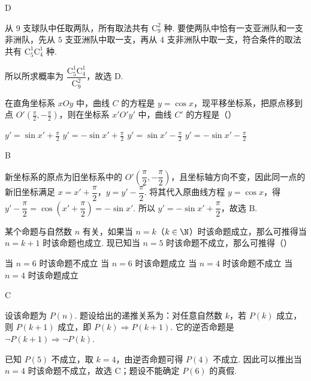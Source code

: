 \documentclass[UTF8,a4paper,oneside,11pt]{ctexbook}
\begin{document}
\begin{answer}
D
\end{answer}

\begin{solution}
从 \(9\) 支球队中任取两队，所有取法共有 \(\mathrm C_9^2\) 种. 要使两队中恰有一支亚洲队和一支非洲队，先从 \(5\) 支亚洲队中取一支，再从 \(4\) 支非洲队中取一支，符合条件的取法共有 \(\mathrm C_5^1\mathrm C_4^1\) 种.

所以所求概率为 \(\dfrac{\mathrm C_5^1\mathrm C_4^1}{\mathrm C_9^2}\)，故选 D.
\end{solution}

\begin{problem}
在直角坐标系 \(xOy\) 中，曲线 \(C\) 的方程是 \(y = \cos x\)，现平移坐标系，把原点移到点 \(O'\left(\frac{\pi}{2}, -\frac{\pi}{2}\right)\)，则在坐标系 \(x'O'y'\) 中，曲线 \(C'\) 的方程是（\quad）

\choices
    {\(y' = \sin x' + \frac{\pi}{2}\)}
    {\(y' = -\sin x' + \frac{\pi}{2}\)}
    {\(y' = \sin x' - \frac{\pi}{2}\)}
    {\(y' = -\sin x' - \frac{\pi}{2}\)}
\end{problem}

\begin{answer}
B
\end{answer}

\begin{solution}
新坐标系的原点为旧坐标系中的 \(O'\left(\dfrac\pi2,-\dfrac\pi2\right)\)，且坐标轴方向不变，因此同一点的新旧坐标满足
\(x=x'+\dfrac\pi2\)，\(y=y'-\dfrac\pi2\). 将其代入原曲线方程 \(y=\cos x\)，得
\(y'-\dfrac\pi2=\cos\left(x'+\dfrac\pi2\right)=-\sin x'\). 所以
\(y'=-\sin x'+\dfrac\pi2\)，故选 B.
\end{solution}

\begin{problem}
某个命题与自然数 \(n\) 有关，如果当 \(n = k\)（\(k \in \N\)）时该命题成立，那么可推得当 \(n = k + 1\) 时该命题也成立. 现已知当 \(n = 5\) 时该命题不成立，那么可推得（\quad）

\choices
    {当 \(n = 6\) 时该命题不成立}
    {当 \(n = 6\) 时该命题成立}
    {当 \(n = 4\) 时该命题不成立}
    {当 \(n = 4\) 时该命题成立}
\end{problem}

\begin{answer}
C
\end{answer}

\begin{solution}
设该命题为 \(P(n)\). 题设给出的递推关系为：对任意自然数 \(k\)，若 \(P(k)\) 成立，则 \(P(k+1)\) 成立，即 \(P(k)\Rightarrow P(k+1)\). 它的逆否命题是 \(\neg P(k+1)\Rightarrow\neg P(k)\).

已知 \(P(5)\) 不成立，取 \(k=4\)，由逆否命题可得 \(P(4)\) 不成立. 因此可以推出当 \(n=4\) 时该命题不成立，故选 C；题设不能确定 \(P(6)\) 的真假.
\end{solution}
\end{document}
